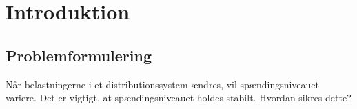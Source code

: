 
\chapter{Introduktion}

\section{Problemformulering}
Når belastningerne i et distributionssystem ændres, vil spændingsniveauet variere. Det er vigtigt, at spændingsniveauet holdes stabilt. Hvordan sikres dette?